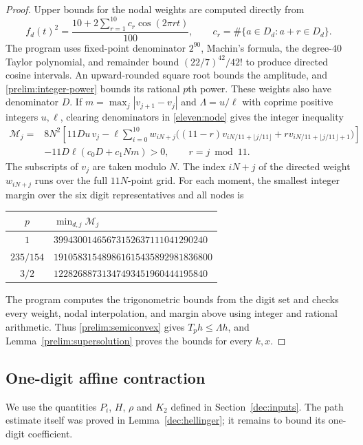 \documentclass[11pt,a4paper]{article}
\theoremstyle{paperplain}
\numberwithin{equation}{section}
\begin{document}
\begin{proof}
Upper bounds for the nodal weights are computed directly from
\[
 f_d(t)^2=\frac{10+2\sum_{r=1}^{10}c_r\cos(2\pi rt)}{100},
 \qquad c_r=\#\{a\in D_d:a+r\in D_d\}.
\]
The program  uses fixed-point denominator $2^{90}$,
Machin's formula, the degree-$40$ Taylor polynomial, and remainder bound
$(22/7)^{42}/42!$ to produce directed cosine intervals. An upward-rounded
square root bounds the amplitude, and \eqref{prelim:integer-power}
bounds its rational $p$th power. These weights also have denominator $D$.
If $m=\max_j|v_{j+1}-v_j|$ and $\Lambda=u/\ell$ with coprime positive integers
$u,\ell$, clearing denominators in \eqref{eleven:node} gives the integer
inequality
\[
 \begin{split}
 \mathcal M_j={}&8N^2\left[
  11Du\,v_j-\ell\sum_{i=0}^{10}w_{iN+j}
       \bigl((11-r)v_{iN/11+\lfloor j/11\rfloor}
               +r v_{iN/11+\lfloor j/11\rfloor+1}\bigr)\right]\\
 &-11D\ell(c_0D+c_1Nm)>0,\qquad r=j\bmod11.
 \end{split}
\]
The subscripts of $v_j$ are taken modulo $N$. The index $iN+j$ of
the directed weight $w_{iN+j}$ runs over the full $11N$-point grid. For each moment, the smallest integer
margin over the six digit representatives and all nodes is
\begin{center}
\begin{tabular}{cl}
\toprule
$p$ & $\min_{d,j}\mathcal M_j$\\
\midrule
$1$ & $39943001465673152637111041290240$\\
$235/154$ & $191058315489861615435892981836800$\\
$3/2$ & $12282688731347493451960444195840$\\
\bottomrule
\end{tabular}
\end{center}
The program  computes the trigonometric bounds
from the digit set and checks every weight, nodal interpolation, and
margin above using integer and rational arithmetic. Thus
\eqref{prelim:semiconvex} gives $T_ph\leqslant\Lambda h$, and
Lemma~\ref{prelim:supersolution} proves the bounds for every $k,x$.
\end{proof}

\subsection{One-digit affine contraction}

We use the quantities $P_i$, $H$, $\rho$ and $K_2$ defined in
Section~\ref{dec:inputs}. The path estimate itself was proved in
Lemma~\ref{dec:hellinger}; it remains to bound its one-digit coefficient.
\end{document}
